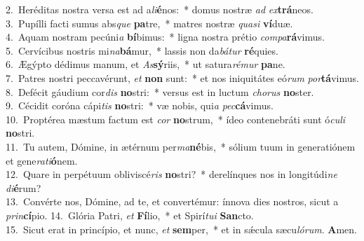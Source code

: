 {2.~}Heréditas nostra versa est ad a\textit{li}\textbf{é}nos:~* domus nostræ \textit{ad} \textit{ex}\textbf{trá}neos.\\
{3.~}Pupílli facti sumus abs\textit{que} \textbf{pa}tre,~* matres nostræ \textit{qua}\textit{si} \textbf{ví}duæ.\\
{4.~}Aquam nostram pecúni\textit{a} \textbf{bí}bimus:~* ligna nostra prétio \textit{com}\textit{pa}\textbf{rá}vimus.\\
{5.~}Cervícibus nostris mi\textit{na}\textbf{bá}mur,~* lassis non da\textit{bá}\textit{tur} \textbf{ré}quies.\\
{6.~}Ægýpto dédimus manum, et \textit{As}\textbf{sý}riis,~* ut satura\textit{ré}\textit{mur} \textbf{pa}ne.\\
{7.~}Patres nostri peccavérunt, \textit{et} \textbf{non} sunt:~* et nos iniquitátes eó\textit{rum} \textit{por}\textbf{tá}vimus.\\
{8.~}Defécit gáudium cor\textit{dis} \textbf{no}stri:~* versus est in luctum \textit{cho}\textit{rus} \textbf{no}ster.\\
{9.~}Cécidit coróna cápi\textit{tis} \textbf{no}stri:~* væ nobis, qui\textit{a} \textit{pec}\textbf{cá}vimus.\\
{10.~}Proptérea mæstum factum est \textit{cor} \textbf{no}strum,~* ídeo contenebráti sunt ó\textit{cu}\textit{li} \textbf{no}stri.\\
{11.~}Tu autem, Dómine, in ætérnum per\textit{ma}\textbf{né}bis,~* sólium tuum in generatiónem et gene\textit{ra}\textit{ti}\textbf{ó}nem.\\
{12.~}Quare in perpétuum obliviscé\textit{ris} \textbf{no}stri?~* derelínques nos in longitúdi\textit{ne} \textit{di}\textbf{é}rum?\\
{13.~}Convérte nos, Dómine, ad te, et convertémur: ínnova dies nostros, sicut a \textit{prin}\textbf{cí}pio.
{14.~}Glória Patri, \textit{et} \textbf{Fí}lio,~* et Spirí\textit{tu}\textit{i} \textbf{San}cto.\\
{15.~}Sicut erat in princípio, et nunc, \textit{et} \textbf{sem}per,~* et in sǽcula sæcu\textit{ló}\textit{rum}. \textbf{A}men.\\
